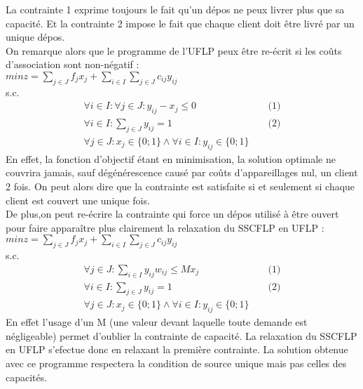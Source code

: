 \documentclass[12pt,a4paper]{article}
\begin{document}
La contrainte 1 exprime toujours le fait qu'un dépos ne peux livrer plus que sa capacité. Et la contrainte 2 impose le fait que chaque client doit être livré par un unique dépos.\\

On remarque alors que le programme de l'UFLP peux être re-écrit si les coûts d'association sont non-négatif :\\
$min z = \sum \limits_{j \in J} f_j x_j + \sum \limits_{i \in I} \sum \limits_{j \in J} c_{ij} y_{ij}$\\
s.c.
\begin{align*}
 \forall i \in I : \forall j \in J : y_{ij} - x_j \leqslant 0 & & \text{ (1)} \\
 \forall i \in I : \sum \limits_{j \in J} y_{ij} = 1 & & \text{ (2)} \\
 \forall j \in J : x_j \in \{0;1\} \land \forall i \in I  : y_{ij} \in \{0;1\} 
\end{align*}
En effet, la fonction d’objectif étant en minimisation, la solution optimale ne couvrira jamais, sauf dégénérescence causé par coûts d’appareillages nul, un client 2 fois. On peut alors dire que la contrainte est satisfaite si et seulement si chaque client est couvert une unique fois.\\
De plus,on peut re-écrire la contrainte qui force un dépos utilisé à être ouvert pour faire apparaître plus clairement la relaxation du SSCFLP en UFLP :\\
$min z = \sum \limits_{j \in J} f_j x_j + \sum \limits_{i \in I} \sum \limits_{j \in J} c_{ij} y_{ij}$\\
s.c.
\begin{align*}
 \forall j \in J : \sum \limits_{i \in I} y_{ij} w_{ij} \leqslant M x_j & & \text{ (1)} \\
 \forall i \in I : \sum \limits_{j \in J} y_{ij} = 1 & & \text{ (2)} \\
 \forall j \in J : x_j \in \{0;1\} \land \forall i \in I  : y_{ij} \in \{0;1\} 
\end{align*}
En effet l'usage d'un M (une valeur devant laquelle toute demande est négligeable) permet d'oublier la contrainte de capacité. La relaxation du SSCFLP en UFLP s'efectue donc en relaxant la première contrainte. La solution obtenue avec ce programme respectera la condition de source unique mais pas celles des capacités.\\
\end{document}
